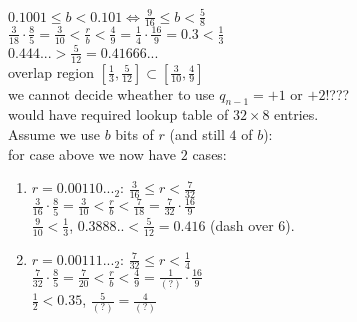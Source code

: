      $0.1001\le b<0.101 \iff \frac{9}{16}\le b<\frac{5}{8}$ \\
     
     $\frac{3}{18}\cdot \frac{8}{5}=\frac{3}{10}<\frac{r}{b}<\frac{4}{9}=\frac{1}{4}\cdot \frac{16}{9}=0.3<\frac{1}{3}$\\
     
     $0.444...>\frac{5}{12}=0.41666...$ \\
     
     \implies overlap region $[\frac{1}{3},\frac{5}{12}]\subset [\frac{3}{10},\frac{4}{9}]$ \\
     \implies we cannot decide wheather to use $q_{n-1}=+1$ or $+2$!??? \\
     would have required lookup table of $32\times 8$ entries.  \\
     
     Assume we use $b$ bits of $r$ (and still $4$ of $b$): \\
     \implies for case above we now have $2$ cases:
     \begin{enumerate}
         \item $r=0.00110..._2$: $\frac{3}{16}\le r<\frac{7}{32} $ \\
         $\frac{3}{16}\cdot \frac{8}{5}=\frac{3}{10}<\frac{r}{b}<\frac{7}{18}=\frac{7}{32}\cdot \frac{16}{9}$\\
         $\frac{9}{10}<\frac{1}{3}$, $0.3888..<\frac{5}{12}=0.416$ (dash over 6). \\
         
         \item $r=0.00111..._2$: $\frac{7}{32}\le r<\frac{1}{4} $ \\
         $\frac{7}{32}\cdot \frac{8}{5}=\frac{7}{20}<\frac{r}{b}<\frac{4}{9}=\frac{1}{(?)}\cdot \frac{16}{9}$\\
         $\frac{1}{2}<0.35$, $\frac{5}{(?)}=\frac{4}{(?)}$ \\
         
         \end{enumerate}